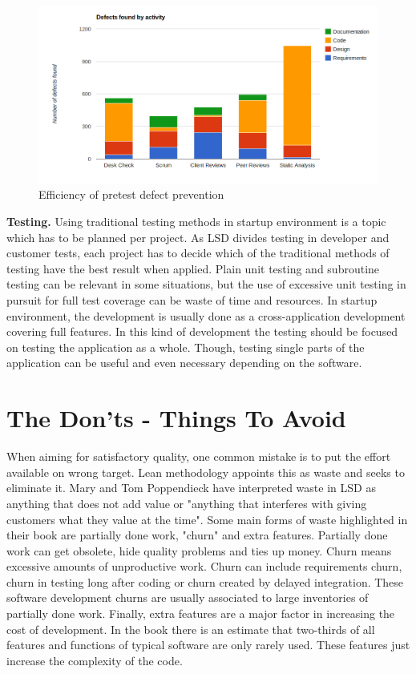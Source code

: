 \begin{figure}[t]
\begin{center}
\includegraphics[width=1.0\textwidth]{image/pretest-efficiency.png}
\end{center}
\caption{Efficiency of pretest defect prevention}
\label{fig:pretest-efficiency}
\end{figure}


\textbf{Testing.} Using traditional testing methods in startup environment is a topic which has to be planned per project. As LSD divides testing in developer and customer tests, each project has to decide which of the traditional methods of testing have the best result when applied. Plain unit testing and subroutine testing can be relevant in some situations, but the use of excessive unit testing in pursuit for full test coverage can be waste of time and resources. In startup environment, the development is usually done as a cross-application development covering full features. In this kind of development the testing should be focused on testing the application as a whole. Though, testing single parts of the application can be useful and even necessary depending on the software.

\section{The Don'ts - Things To Avoid}
\label{sec:donts}

When aiming for satisfactory quality, one common mistake is to put the effort available on wrong target. Lean methodology appoints this as waste and seeks to eliminate it. Mary and Tom Poppendieck have interpreted waste in LSD as anything that does not add value or "anything that interferes with giving customers what they value at the time". Some main forms of waste highlighted in their book are partially done work, "churn" and extra features. Partially done work can get obsolete, hide quality problems and ties up money. Churn means excessive amounts of unproductive work. Churn can include requirements churn, churn in testing long after coding or churn created by delayed integration. These software development churns are usually associated to large inventories of partially done work. Finally, extra features are a major factor in increasing the cost of development. In the book there is an estimate that two-thirds of all features and functions of typical software are only rarely used. These features just increase the complexity of the code.~\cite{poppendieck2006implementing} 

